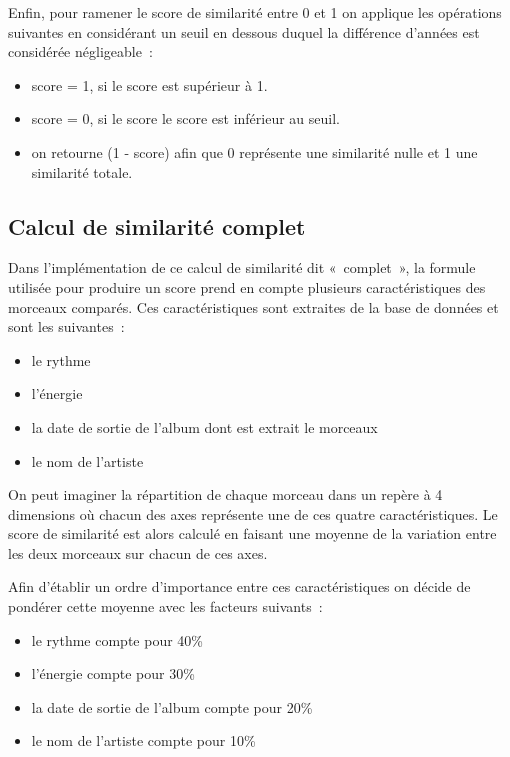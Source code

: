Enfin, pour ramener le score de similarité entre 0 et 1 on applique les
opérations suivantes en considérant un seuil en dessous duquel la différence
d'années est considérée négligeable~:

\begin{itemize}
\item score = 1, si le score est supérieur à 1. 
\item score = 0, si le score le score est inférieur au seuil.
\item on retourne (1 - score) afin que 0 représente une similarité nulle et 1
une similarité totale.
\end{itemize}

\subsection{Calcul de similarité complet}
\label{impl:similarite:complet}

Dans l'implémentation de ce calcul de similarité dit «~complet~», la formule
utilisée pour produire un score prend en compte plusieurs caractéristiques des
morceaux comparés. Ces caractéristiques sont extraites de la base de données
et sont les suivantes~:

\begin{itemize}
\item le rythme
\item l'énergie
\item la date de sortie de l'album dont est extrait le morceaux
\item le nom de l'artiste
\end{itemize}

On peut imaginer la répartition de chaque morceau dans un repère à 4
dimensions où chacun des axes représente une de ces quatre caractéristiques.
Le score de similarité est alors calculé en faisant une moyenne de la
variation entre les deux morceaux sur chacun de ces axes.

Afin d'établir un ordre d'importance entre ces caractéristiques on décide de
pondérer cette moyenne avec les facteurs suivants~:

\begin{itemize}
\item le rythme compte pour 40\%
\item l'énergie compte pour 30\%
\item la date de sortie de l'album compte pour 20\%
\item le nom de l'artiste compte pour 10\%
\end{itemize}

